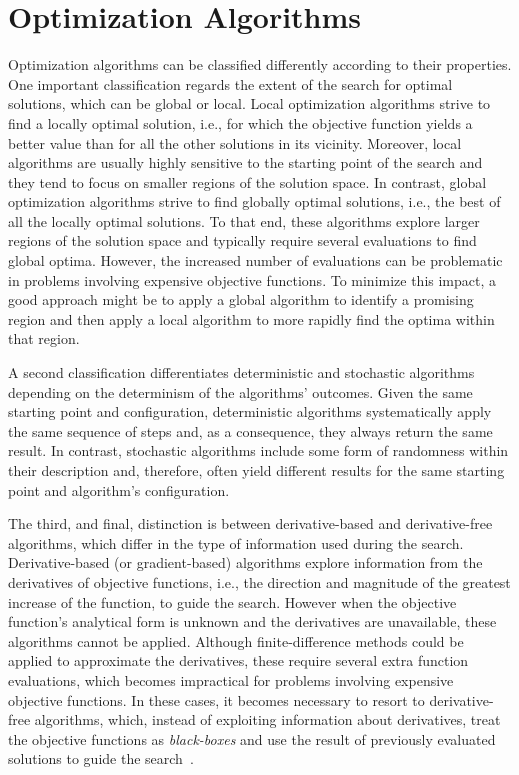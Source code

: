 
\section{Optimization Algorithms}
\label{sec:backg}
Optimization algorithms can be classified differently according to their properties. One important classification regards the extent of the search for optimal solutions, which can be global or local. Local optimization algorithms strive to find a locally optimal solution, i.e., for which the objective function yields a better value than for all the other solutions in its vicinity. Moreover, local algorithms are usually highly sensitive to the starting point of the search and they tend to focus on smaller regions of the solution space. In contrast, global optimization algorithms strive to find globally optimal solutions, i.e., the best of all the locally optimal solutions. To that end, these algorithms explore larger regions of the solution space and typically require several evaluations to find global optima. However, the increased number of evaluations can be problematic in problems involving expensive objective functions. To minimize this impact, a good approach might be to apply a global algorithm to identify a promising region and then apply a local algorithm to more rapidly find the optima within that region. 

A second classification differentiates deterministic and stochastic algorithms depending on the determinism of the algorithms' outcomes. Given the same starting point and configuration, deterministic algorithms systematically apply the same sequence of steps and, as a consequence, they always return the same result. In contrast, stochastic algorithms include some form of randomness within their description and, therefore, often yield different results for the same starting point and algorithm's configuration.

The third, and final, distinction is between derivative-based and derivative-free algorithms, which differ in the type of information used during the search. Derivative-based (or gradient-based) algorithms explore information from the derivatives of objective functions, i.e., the direction and magnitude of the greatest increase of the function, to guide the search. %
However when the objective function's analytical form is unknown and the derivatives are unavailable, these algorithms cannot be applied. Although finite-difference methods could be applied to approximate the derivatives, these require several extra function evaluations, which becomes impractical for problems involving expensive objective functions. In these cases, it becomes necessary to resort to derivative-free algorithms, which, instead of exploiting information about derivatives, treat the objective functions as \textit{black-boxes} and use the result of previously evaluated solutions to guide the search~\cite{Rios2013}.

